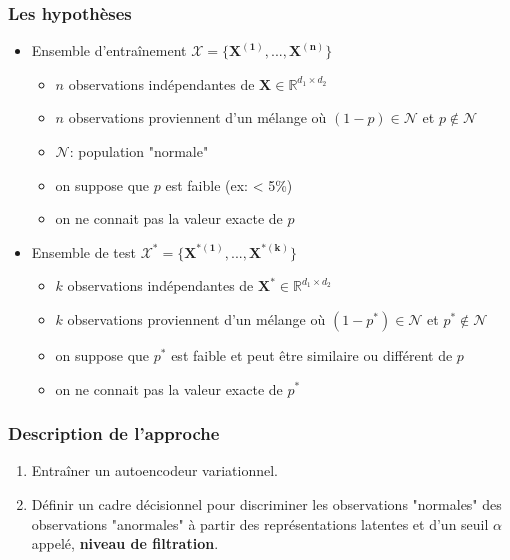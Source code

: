 \documentclass{beamer}
\begin{document}
	\begin{frame}
		\frametitle{Les hypothèses}
		\begin{itemize}
			\item Ensemble d'entraînement $\mathcal{X} = \{\boldsymbol{X^{(1)}}, ..., \boldsymbol{X^{(n)}}\}$
				\begin{itemize}
					\item $n$ observations indépendantes de $\boldsymbol{X} \in \mathbb{R}^{d_1 \times d_2}$
					\item $n$ observations proviennent d'un mélange où $(1-p) \in \mathcal{N}$ et $p \not\in \mathcal{N}$
					\item $\mathcal{N}$: population "normale"
					\item on suppose que $p$ est faible (ex: < 5\%)
					\item on ne connait pas la valeur exacte de $p$
				\end{itemize}
			\item Ensemble de test $\mathcal{X^*} = \{\boldsymbol{X^{*(1)}},...,\boldsymbol{X^{*(k)}}\}$
				\begin{itemize}
					\item $k$ observations indépendantes de $\boldsymbol{X^{*}} \in \mathbb{R}^{d_1 \times d_2}$
					\item $k$ observations proviennent d'un mélange où $(1-p^{*}) \in \mathcal{N}$ et $p^{*} \not\in \mathcal{N}$
					\item on suppose que $p^{*}$ est faible et peut être similaire ou différent de $p$
					\item on ne connait pas la valeur exacte de $p^{*}$
				\end{itemize}
		\end{itemize}
	\end{frame}

	\begin{frame}
		\frametitle{Description de l'approche}
		\begin{enumerate}
			\item Entraîner un autoencodeur variationnel.
			\item Définir un cadre décisionnel pour discriminer les observations "normales" des observations "anormales" à partir des représentations latentes et d'un seuil $\alpha$ appelé, \textbf{niveau de filtration}.
		\end{enumerate}
	\end{frame}
\end{document}
